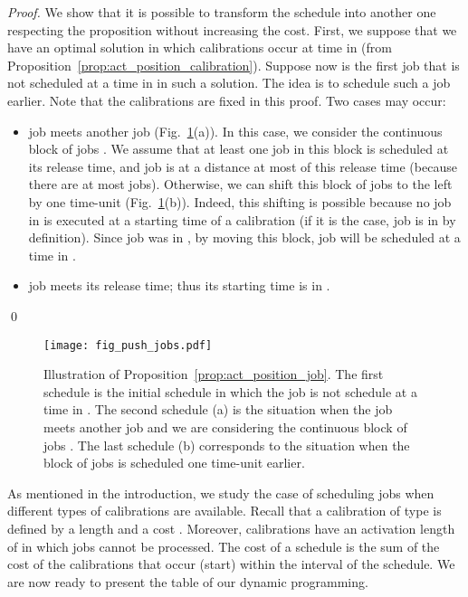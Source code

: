 \begin{proof}
We show that it is possible to transform the schedule into another one respecting the proposition without increasing the cost. First, we suppose that we have an optimal solution in which calibrations occur at time in  (from Proposition~\ref{prop:act_position_calibration}). Suppose now  is the first job that is not scheduled at a time in  in such a solution. The idea is to schedule such a job earlier. Note that the calibrations are fixed in this proof. Two cases may occur:
\begin{itemize}
\item job  meets another job  (Fig.~\ref{fig:push_jobs}(a)). In this case, we consider the continuous block of jobs . We assume that at least one job in this block is scheduled at its release time, and job  is at a distance at most  of this release time (because there are at most  jobs). Otherwise, we can shift this block of jobs to the left by one time-unit (Fig.~\ref{fig:push_jobs}(b)). Indeed, this shifting is possible because no job in  is executed at a starting time of a calibration (if it is the case, job  is in  by definition). Since job  was in , by moving this block, job  will be scheduled at a time in .
\item job  meets its release time; thus its starting time is in .
\end{itemize}
\qed\end{proof}


\begin{figure}
\centering
\texttt{[image: fig\_push\_jobs.pdf]}
\caption{Illustration of Proposition~\ref{prop:act_position_job}. The first schedule is the initial schedule in which the job  is not schedule at a time in . The second schedule (a) is the situation when the job  meets another job  and we are considering the continuous block of jobs . The last schedule (b) corresponds to the situation when the block of jobs is scheduled one time-unit earlier.}
\label{fig:push_jobs}
\end{figure}



As mentioned in the introduction, we study the case of scheduling jobs when  different types of calibrations are available. Recall that a calibration of type  is defined by a length  and a cost . Moreover, calibrations have an activation length of  in which jobs cannot be processed. The cost of a schedule is the sum of the cost of the calibrations that occur (start) within the interval of the schedule.
We are now ready to present the table of our dynamic programming. 

